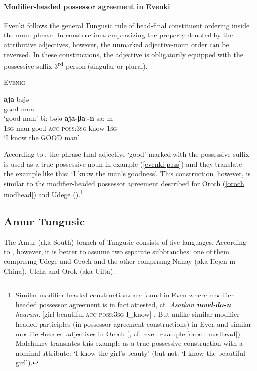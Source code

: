 \paragraph{Modifier-headed possessor agreement in Evenki}
Evenki follows the general Tungusic rule of head-final constituent ordering inside the noun phrase. In constructions emphasizing the property denoted by the attributive adjectives, however, the unmarked adjective-noun order can be reversed. In these constructions, the adjective is obligatorily equipped with the possessive suffix 3\textsuperscript{rd} person (singular or plural).
\begin{exe}
\ex \textsc{Evenki} \citep[18]{bulatova-etal1999} 
\begin{xlist}
\ex	
\gll	\textbf{aja} bəjə\\
	good man\\
\glt	‘good man’
\ex	\label{evenki poss}
\gll	bi: bəjə \textbf{aja-βa:-n} sa:-m\\
	\textsc{1sg} man good-\textsc{acc}-\textsc{poss:3sg} know-\textsc{1sg}\\
\glt	‘I know the GOOD man’
\end{xlist}
\end{exe}
According to \citet[18]{bulatova-etal1999}, the phrase final adjective ‘good’ marked with the possessive suffix is used as a true possessive noun in example (\ref{evenki poss}) and they translate the example like this: ‘I know the man's goodness’. This construction, however, is similar to the modifier-headed possessor agreement described for Oroch (\ref{oroch modhead}) and Udege (\citealt[485, elsewhere]{nikolaeva-etal2001}).\footnote{Similar modifier-headed constructions are found in Even where modifier-headed possessor agreement is in fact attested, cf.~\textit{Asatkan \textbf{nood-do-n} haaram.} [girl beautiful-\textsc{acc}-\textsc{poss:3sg} I\_know] \citep[11]{malchukov1995}. But unlike similar modifier-headed participles (in possessor agreement constructions) in Even \citep[31]{malchukov1995} and similar modifier-headed adjectives in Oroch (\citealt{malchukov2000}, cf.~even example \ref{oroch modhead}) Malchukov translates this example as a true possessive construction with a nominal attribute: ‘I know the girl's beauty’ (but not: ‘I know the beautiful girl’).}

\subsection{Amur Tungusic}
The Amur (aka South) branch of Tungusic consists of five languages. According to \citet[223]{salminen2007}, however, it is better to assume two separate subbranches: one of them comprising Udege and Oroch and the other comprising Nanay (aka Hejen in China), Ulcha and Orok (aka Uilta).

